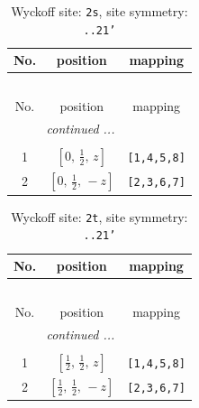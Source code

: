 \documentclass[fleqn,8pt]{jsarticle}
\begin{document}
\renewcommand{\arraystretch}{1.2}
\begin{longtable}{ccc}
\caption{Wyckoff site: {\tt 2s}, site symmetry: {\tt ..21'}}
 \\
 \hline \hline
No. & position & mapping \\ \hline \endfirsthead

\multicolumn{2}{l}{\tablename\ \thetable{}} \\
 \hline \hline
No. & position & mapping \\ \hline \endhead

 \hline \hline
\multicolumn{2}{r}{\footnotesize\it continued ...} \\ \endfoot

 \hline \hline
\multicolumn{2}{r}{} \\ \endlastfoot

1 & $\left[ 0,\, \frac{1}{2},\, z \right]$ & {\tt [1,4,5,8]} \\ \hline
2 & $\left[ 0,\, \frac{1}{2},\, - z \right]$ & {\tt [2,3,6,7]} \\
\end{longtable}
\renewcommand{\arraystretch}{1.2}
\begin{longtable}{ccc}
\caption{Wyckoff site: {\tt 2t}, site symmetry: {\tt ..21'}}
 \\
 \hline \hline
No. & position & mapping \\ \hline \endfirsthead

\multicolumn{2}{l}{\tablename\ \thetable{}} \\
 \hline \hline
No. & position & mapping \\ \hline \endhead

 \hline \hline
\multicolumn{2}{r}{\footnotesize\it continued ...} \\ \endfoot

 \hline \hline
\multicolumn{2}{r}{} \\ \endlastfoot

1 & $\left[ \frac{1}{2},\, \frac{1}{2},\, z \right]$ & {\tt [1,4,5,8]} \\ \hline
2 & $\left[ \frac{1}{2},\, \frac{1}{2},\, - z \right]$ & {\tt [2,3,6,7]} \\
\end{longtable}
\renewcommand{\arraystretch}{1.2}
\end{document}
